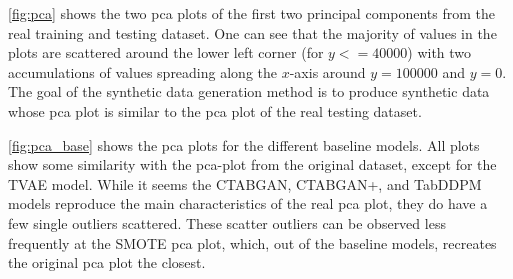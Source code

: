 \autoref{fig:pca} shows the two \gls{pca} plots of the first two principal components from the real training and testing dataset.
One can see that the majority of values in the plots are scattered around the lower left corner (for $y<=40000$) with two accumulations of values spreading along the $x$-axis around $y=100000$ and $y=0$.
The goal of the synthetic data generation method is to produce synthetic data whose \gls{pca} plot is similar to the \gls{pca} plot of the real testing dataset.


\autoref{fig:pca_base} shows the \gls{pca} plots for the different baseline models. 
All plots show some similarity with the \gls{pca}-plot from the original dataset, except for the TVAE model. 
While it seems the CTABGAN, CTABGAN+, and TabDDPM models reproduce the main characteristics of the real \gls{pca} plot, they do have a few single outliers scattered.
These scatter outliers can be observed less frequently at the SMOTE \gls{pca} plot, which, out of the baseline models, recreates the original \gls{pca} plot the closest.


